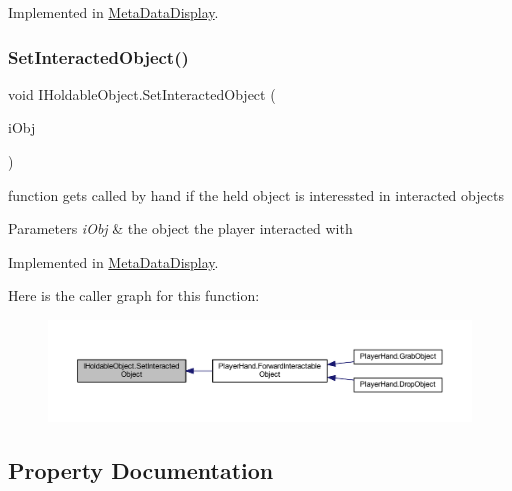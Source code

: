 Implemented in \mbox{\hyperlink{class_meta_data_display_a1ecbc336a25464fc9999120066263e2a}{Meta\+Data\+Display}}.

\mbox{\label{interface_i_holdable_object_aeb32a55273b99d16f9fb5b86f6a73f80}} 
\subsubsection{\texorpdfstring{Set\+Interacted\+Object()}{SetInteractedObject()}}
{\footnotesize\ttfamily void I\+Holdable\+Object.\+Set\+Interacted\+Object (\begin{DoxyParamCaption}\item[{\mbox{\hyperlink{interface_i_interactable}{I\+Interactable}}}]{i\+Obj }\end{DoxyParamCaption})}



function get\textquotesingle{}s called by hand if the held object is interessted in interacted objects 


\begin{DoxyParams}{Parameters}
{\em i\+Obj} & the object the player interacted with\\
\hline
\end{DoxyParams}


Implemented in \mbox{\hyperlink{class_meta_data_display_a29b7b1ec6193b73606dc7da89c387529}{Meta\+Data\+Display}}.

Here is the caller graph for this function\+:
\nopagebreak
\begin{figure}[H]
\begin{center}
\leavevmode
\includegraphics[width=350pt]{interface_i_holdable_object_aeb32a55273b99d16f9fb5b86f6a73f80_icgraph}
\end{center}
\end{figure}


\subsection{Property Documentation}
\mbox{\label{interface_i_holdable_object_a99b6760e4f5c71c79d8b084673a3818b}} 
